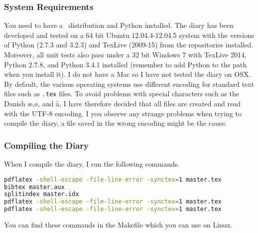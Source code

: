 \subsubsection*{System Requirements}
You need to have a \LaTeXe\ distribution and Python installed. The diary has been developed and tested on a 64 bit Ubuntu 12.04.4-12.04.5 system with the versions of Python (2.7.3 and 3.2.3) and TexLive (2009-15) from the repositories installed. Moreover, all unit tests also pass under a 32 bit Windows 7 with TexLive 2014, Python 2.7.8, and Python 3.4.1 installed (remember to add Python to the path when you install it). I do not have a Mac so I have not tested the diary on OSX. By default, the various operating systems use different encoding for standard text files such as {\tt .tex} files. To avoid problems with special characters such as the Danish æ,ø, and å, I have therefore decided that all files are created and read with the UTF-8 encoding. I you observe any strange problems when trying to compile the diary, a file saved in the wrong encoding might be the cause.

\subsubsection*{Compiling the Diary}
When I compile the diary, I run the following commands.
\begin{lstlisting}[language=bash]
pdflatex -shell-escape -file-line-error -synctex=1 master.tex
bibtex master.aux
splitindex master.idx
pdflatex -shell-escape -file-line-error -synctex=1 master.tex
pdflatex -shell-escape -file-line-error -synctex=1 master.tex
\end{lstlisting}
You can find these commands in the Makefile which you can use on Linux.


